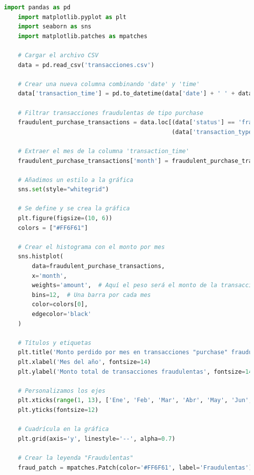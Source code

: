 \documentclass{article}
\begin{document}
\begin{itemize}
  \begin{lstlisting}[language=Python, caption= Implementación histograma del monto perdido por mes por transaccines de tipo purchase con estado fraudolenta.]
    import pandas as pd
    import matplotlib.pyplot as plt
    import seaborn as sns
    import matplotlib.patches as mpatches
    
    # Cargar el archivo CSV
    data = pd.read_csv('transacciones.csv')
    
    # Crear una nueva columna combinando 'date' y 'time'
    data['transaction_time'] = pd.to_datetime(data['date'] + ' ' + data['time'], format='%d/%m/%Y %H:%M')
    
    # Filtrar transacciones fraudulentas de tipo purchase
    fraudulent_purchase_transactions = data.loc[(data['status'] == 'fraudulent') & 
                                                (data['transaction_type'] == 'purchase')].copy()
    
    # Extraer el mes de la columna 'transaction_time'
    fraudulent_purchase_transactions['month'] = fraudulent_purchase_transactions['transaction_time'].dt.month
    
    # Añadimos un estilo a la gráfica
    sns.set(style="whitegrid")
    
    # Se define y se crea la gráfica
    plt.figure(figsize=(10, 6))
    colors = ["#FF6F61"]
    
    # Crear el histograma con el monto por mes
    sns.histplot(
        data=fraudulent_purchase_transactions,
        x='month', 
        weights='amount',  # Aquí el peso será el monto de la transacción
        bins=12,  # Una barra por cada mes
        color=colors[0],
        edgecolor='black'
    )
    
    # Títulos y etiquetas
    plt.title('Monto perdido por mes en transacciones "purchase" fraudulentas', fontsize=16, fontweight='bold')
    plt.xlabel('Mes del año', fontsize=14)
    plt.ylabel('Monto total de transacciones fraudulentas', fontsize=14)
    
    # Personalizamos los ejes
    plt.xticks(range(1, 13), ['Ene', 'Feb', 'Mar', 'Abr', 'May', 'Jun', 'Jul', 'Ago', 'Sep', 'Oct', 'Nov', 'Dic'], fontsize=12)
    plt.yticks(fontsize=12)
    
    # Cuadrícula en la gráfica
    plt.grid(axis='y', linestyle='--', alpha=0.7)
    
    # Crear la leyenda "Fraudulentas"
    fraud_patch = mpatches.Patch(color='#FF6F61', label='Fraudulentas')
    

\end{lstlisting}
\end{itemize}
\end{document}
